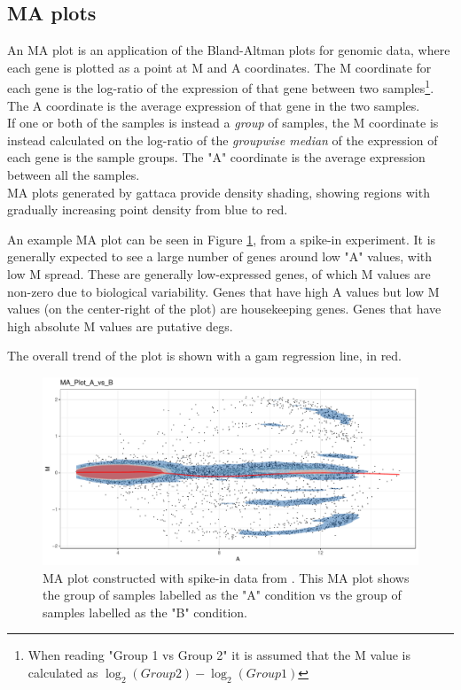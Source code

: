 \subsection{MA plots}
\label{plot:MA}
An MA plot is an application of the Bland-Altman plots for genomic data, where each gene is plotted as a point at M and A coordinates. The M coordinate for each gene is the log-ratio of the expression of that gene between two samples\footnote{When reading "Group 1 vs Group 2" it is assumed that the M value is calculated as $\log_2(Group 2) - \log_2(Group 1)$}. The A coordinate is the average expression of that gene in the two samples.\\
If one or both of the samples is instead a \textit{group} of samples, the M coordinate is instead calculated on the log-ratio of the \textit{groupwise median} of the expression of each gene is the sample groups. The "A" coordinate is the average expression between all the samples.\\
MA plots generated by \gls{gattaca} provide density shading, showing regions with gradually increasing point density from blue to red.

An example MA plot can be seen in Figure \ref{fig:PlatinumMAplot}, from a spike-in experiment. It is generally expected to see a large number of genes around low "A" values, with low M spread. These are generally low-expressed genes, of which M values are non-zero due to biological variability. Genes that have high A values but low M values (on the center-right of the plot) are housekeeping genes. Genes that have high absolute M values are putative \glspl{deg}.

The overall trend of the plot is shown with a \gls{gam} regression line, in red.

\begin{figure}
    \centering
    \includegraphics{resources/images/3_MA_Plot_A_vs_B.pdf}
    \caption{MA plot constructed with spike-in data from \textcite{zhuPreferredAnalysisMethods2010}. This MA plot shows the group of samples labelled as the "A" condition vs the group of samples labelled as the "B" condition.}
    \label{fig:PlatinumMAplot}
\end{figure}

